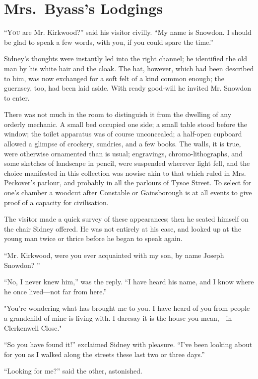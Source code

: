 \chapter{Mrs.\ Byass's Lodgings}

\textsc{``You} are Mr. Kirkwood?'' said his visitor civilly. ``My name
is Snowdon. I should be glad to speak a few words, with you, if you
could spare the time.''

Sidney's thoughts were instantly led into the right channel; he
identified the old man by his white hair and the cloak. The hat,
however, which had been described to him, was now exchanged for a soft
felt of a kind common enough; the guernsey, too, had been laid aside.
With ready good-will he invited Mr. Snowdon to enter.

There was not much in the room to distinguish it from the dwelling of
any orderly mechanic. A small bed occupied one side; a small table stood
before the window; the toilet apparatus was of course unconcealed; {}a
half-open cupboard allowed a glimpse of crockery, sundries, and a few
books. The walls, it is true, were otherwise ornamented than is usual;
engravings, chromo-lithographs, and some sketches of landscape in
pencil, were suspended wherever light fell, and the choice manifested in
this collection was nowise akin to that which ruled in Mrs. Peckover's
parlour, and probably in all the parlours of Tysoe Street. To select for
one's chamber a woodcut after Constable or Gainsborough is at all events
to give proof of a capacity for civilisation.

The visitor made a quick survey of these appearances; then he seated
himself on the chair Sidney offered. He was not entirely at his ease,
and looked up at the young man twice or thrice before he began to speak
again.

``Mr. Kirkwood, were you ever acquainted with my son, by name Joseph
Snowdon? ''

``No, I never knew him,'' was the reply. ``I have heard his name, and I
know where he once lived---not far from here.''

"You're wondering what has brought me {}to you. I have heard of you from
people a grandchild of mine is living with. I daresay it is the house
you mean,---in Clerkenwell Close."

``So you have found it!'' exclaimed Sidney with pleasure. ``I've been
looking about for you as I walked along the streets these last two or
three days.''

``Looking for me?'' said the other, astonished.

